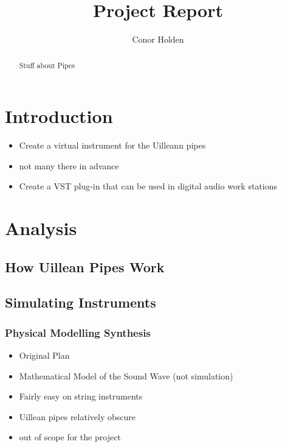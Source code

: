 \documentclass[12pt]{article}
\title{Project Report}
\author{Conor Holden }
\begin{document}
	
	\maketitle
	
	\begin{abstract}
	Stuff about Pipes
	
		
	\end{abstract}

	
	
	
	\tableofcontents
	
	
\section{Introduction}
	
	\begin{itemize}
		\item Create a virtual instrument for the Uilleann pipes
		\item not many there in advance
		\item Create a VST plug-in that can be used in digital audio work stations
	\end{itemize}
	
	
\section{Analysis}
	
	
	\subsection{How Uillean Pipes Work}	
	
	
	\subsection{ Simulating Instruments }
	
	\subsubsection{Physical Modelling Synthesis}
	\begin{itemize}
		\item Original Plan
		\item Mathematical Model of the Sound Wave (not simulation)
		\item Fairly easy on string instruments
		\item Uillean pipes relatively obscure
		\item out of scope for the project
	\end{itemize}
\end{document}

